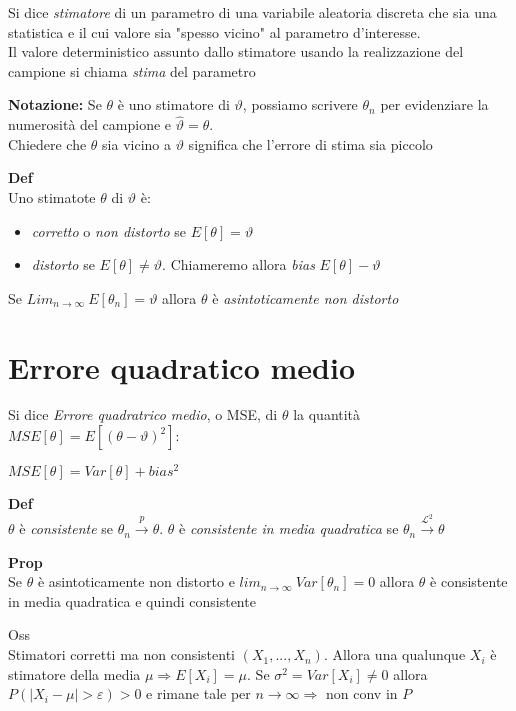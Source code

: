 \documentclass[11pt, letterpaper]{article}
\begin{document}
Si dice \textit{stimatore} di un parametro di una variabile aleatoria discreta che sia una statistica e il cui
valore sia "spesso vicino" al parametro d'interesse.\\ Il valore deterministico assunto dallo stimatore usando la
realizzazione del campione si chiama \textit{stima} del parametro

\textbf{Notazione:} Se $\theta$ è uno stimatore di $\vartheta$, possiamo scrivere $\theta_{n}$ per evidenziare la 
numerosità del campione e $\hat{\vartheta}=\theta$.\\ Chiedere che $\theta$ sia vicino a $\vartheta$ significa che 
l'errore di stima sia piccolo

\textbf{Def}\\Uno stimatote $\theta$ di $\vartheta$ è:
\begin{itemize}
    \item \textit{corretto} o \textit{non distorto} se $E[\theta]=\vartheta$
    \item \textit{distorto} se $E[\theta]\neq\vartheta$. Chiameremo allora \textit{bias} $E[\theta]-\vartheta$
\end{itemize}
Se $Lim_{n\to\infty}\ E[\theta_{n}]=\vartheta$ allora $\theta$ è \textit{asintoticamente non distorto}

\section{Errore quadratico medio}
Si dice \textit{Errore quadratrico medio}, o MSE, di $\theta$ la quantità $MSE[\theta]=E[(\theta-\vartheta)^{2}]$:
\begin{center}
    $MSE[\theta]=Var[\theta]+bias^{2}$
\end{center}

\textbf{Def}\\$\theta$ è \textit{consistente} se $\theta_{n}\xrightarrow{p}\theta$. $\theta$ è \textit{consistente
in media quadratica} se $\theta_{n}\xrightarrow{\mathcal{L}^{2}}\theta$

\textbf{Prop}\\Se $\theta$ è asintoticamente non distorto e $lim_{n\to\infty}\ Var[\theta_{n}]=0$ allora $\theta$
è consistente in media quadratica e quindi consistente

Oss\\ Stimatori corretti ma non consistenti $(X_{1},...,X_{n})$. Allora una qualunque $X_{i}$ è stimatore della
media $\mu\Rightarrow E[X_{i}]=\mu$. Se $\sigma^{2}=Var[X_{i}]\neq 0$ allora $P(|X_{i}-\mu|>\varepsilon)>0$ e 
rimane tale per $n\to\infty\Rightarrow$ non conv in $P$

\newpage
\thispagestyle{fancy}
\end{document}
